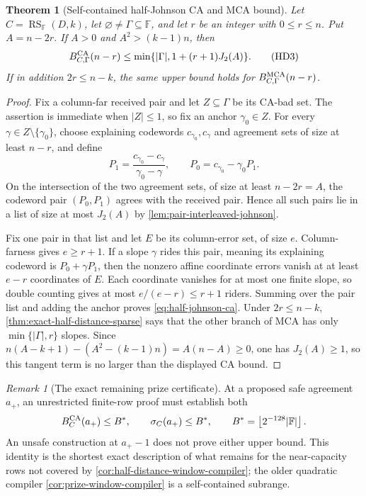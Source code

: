 \documentclass[11pt,a4paper]{amsart}
\numberwithin{equation}{section}
\newtheorem{theorem}{Theorem}[section]
\theoremstyle{remark}
\newtheorem{remark}[remark]{Remark}
\DeclareMathOperator{\RS}{RS}
\newcommand{\F}{\mathbb F}
\newcommand{\abs}[1]{\lvert #1\rvert}
\newcommand{\floor}[1]{\left\lfloor #1\right\rfloor}
\begin{document}
\begin{theorem}[Self-contained half-Johnson CA and MCA bound]
\label{thm:self-contained-half-johnson}
Let \(C=\RS_\F(D,k)\), let \(\varnothing\ne\Gamma\subseteq\F\), and
let \(r\) be an integer with \(0\le r\le n\).  Put \(A=n-2r\).  If
\(A>0\) and \(A^2>(k-1)n\), then
\[
 B_{C,\Gamma}^{\rm CA}(n-r)
 \le\min\{\abs\Gamma,1+(r+1)J_2(A)\}.             \tag{HD3}
 \label{eq:half-johnson-ca}
\]
If in addition \(2r\le n-k\), the same upper bound holds for
\(B_{C,\Gamma}^{\rm MCA}(n-r)\).
\end{theorem}

\begin{proof}
Fix a column-far received pair and let \(Z\subseteq\Gamma\) be its
CA-bad set.  The assertion is immediate when \(\abs Z\le1\), so fix an
anchor \(\gamma_0\in Z\).  For every
\(\gamma\in Z\setminus\{\gamma_0\}\), choose explaining codewords
\(c_{\gamma_0},c_\gamma\) and agreement sets of size at least \(n-r\),
and define
\[
 P_1=\frac{c_{\gamma_0}-c_\gamma}{\gamma_0-\gamma},
 \qquad P_0=c_{\gamma_0}-\gamma_0P_1.
\]
On the intersection of the two agreement sets, of size at least
\(n-2r=A\), the codeword pair \((P_0,P_1)\) agrees with the received
pair.  Hence all such pairs lie in a list of size at most \(J_2(A)\) by
\cref{lem:pair-interleaved-johnson}.

Fix one pair in that list and let \(E\) be its column-error set, of size
\(e\).  Column-farness gives \(e\ge r+1\).  If a slope \(\gamma\) rides
this pair, meaning its explaining codeword is \(P_0+\gamma P_1\), then
the nonzero affine coordinate errors vanish at at least \(e-r\)
coordinates of \(E\).  Each coordinate vanishes for at most one finite
slope, so double counting gives at most
\(e/(e-r)\le r+1\) riders.  Summing over the pair list and adding the
anchor proves \eqref{eq:half-johnson-ca}.  Under \(2r\le n-k\),
\cref{thm:exact-half-distance-sparse} says that the other branch of MCA
has only \(\min\{\abs\Gamma,r\}\) slopes.  Since
\(n(A-k+1)-(A^2-(k-1)n)=A(n-A)\ge0\), one has \(J_2(A)\ge1\), so this
tangent term is no larger than the displayed CA bound.
\end{proof}

\begin{remark}[The exact remaining prize certificate]
\label{rem:exact-prize-certificate}
At a proposed safe agreement \(a_+\), an unrestricted finite-row proof
must establish both
\[
 B_C^{\rm CA}(a_+)\le B^*,\qquad
 \sigma_C(a_+)\le B^*,\qquad
 B^*=\floor{2^{-128}\abs\F}.
\]
An unsafe construction at \(a_+-1\) does not prove either upper bound.
This identity is the shortest exact description of what remains for the
near-capacity rows not covered by
\cref{cor:half-distance-window-compiler}; the older quadratic compiler
\cref{cor:prize-window-compiler} is a self-contained subrange.
\end{remark}
\end{document}
